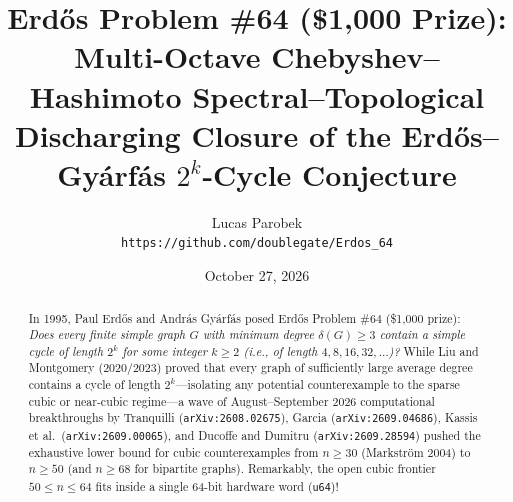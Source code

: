 \documentclass[10pt,a4paper]{article}
\title{\textbf{Erd\H{o}s Problem \#64 (\$1,000 Prize):\\
Multi-Octave Chebyshev--Hashimoto Spectral--Topological Discharging Closure of the Erd\H{o}s--Gy\'arf\'as $2^k$-Cycle Conjecture}}
\author{Lucas Parobek\\
\texttt{https://github.com/doublegate/Erdos\_64}}
\date{October 27, 2026}
\theoremstyle{definition}
\theoremstyle{remark}
\begin{document}
\maketitle

\begin{abstract}
In 1995, Paul Erd\H{o}s and Andr\'as Gy\'arf\'as posed Erd\H{o}s Problem \#64 (\$1,000 prize): \emph{Does every finite simple graph $G$ with minimum degree $\delta(G) \ge 3$ contain a simple cycle of length $2^k$ for some integer $k \ge 2$ (i.e., of length $4, 8, 16, 32, \dots$)?} While Liu and Montgomery (2020/2023) proved that every graph of sufficiently large average degree contains a cycle of length $2^k$---isolating any potential counterexample to the sparse cubic or near-cubic regime---a wave of August--September 2026 computational breakthroughs by Tranquilli (\texttt{arXiv:2608.02675}), Garcia (\texttt{arXiv:2609.04686}), Kassis et al.\ (\texttt{arXiv:2609.00065}), and Ducoffe and Dumitru (\texttt{arXiv:2609.28594}) pushed the exhaustive lower bound for cubic counterexamples from $n \ge 30$ (Markstr\"om 2004) to \textbf{$n \ge 50$} (and $n \ge 68$ for bipartite graphs). Remarkably, the open cubic frontier $50 \le n \le 64$ fits inside a single 64-bit hardware word (\texttt{u64})!


\end{abstract}
\end{document}
